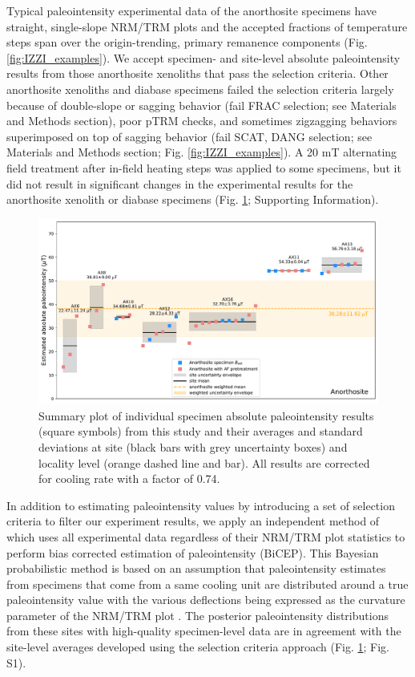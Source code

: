 \documentclass[9pt,twocolumn,twoside,lineno]{pnas-new}
\begin{document}
Typical paleointensity experimental data of the anorthosite specimens have straight, single-slope NRM/TRM plots and the accepted fractions of temperature steps span over the origin-trending, primary remanence components (Fig. \ref{fig:IZZI_examples}). We accept specimen- and site-level absolute paleointensity results from those anorthosite xenoliths that pass the selection criteria. Other anorthosite xenoliths and diabase specimens failed the selection criteria largely because of double-slope or sagging behavior (fail FRAC selection; see Materials and Methods section), poor pTRM checks, and sometimes zigzagging behaviors superimposed on top of sagging behavior (fail SCAT, DANG selection; see Materials and Methods section; Fig. \ref{fig:IZZI_examples}). A 20 mT alternating field treatment after in-field heating steps was applied to some specimens, but it did not result in significant changes in the experimental results for the anorthosite xenolith or diabase specimens (Fig. \ref{fig:PINT_cooling_corrected}; Supporting Information). 

\begin{figure}[h!]
\noindent\includegraphics[width=17.8 cm]{Paleointensity_plot_cooling_corrected.pdf}
\centering
\caption{\small{Summary plot of individual specimen absolute paleointensity results (square symbols) from this study and their averages and standard deviations at site (black bars with grey uncertainty boxes) and locality level (orange dashed line and bar). All results are corrected for cooling rate with a factor of 0.74. }}
\label{fig:PINT_cooling_corrected}
\end{figure}

In addition to estimating paleointensity values by introducing a set of selection criteria to filter our experiment results, we apply an independent method of \citealp{Cych2021a} which uses all experimental data regardless of their NRM/TRM plot statistics to perform bias corrected estimation of paleointensity (BiCEP). This Bayesian probabilistic method is based on an assumption that paleointensity estimates from specimens that come from a same cooling unit are distributed around a true paleointensity value with the various deflections being expressed as the curvature parameter of the NRM/TRM plot \cite{Paterson2011a}. The posterior paleointensity distributions from these sites with high-quality specimen-level data are in agreement with the site-level averages developed using the selection criteria approach (Fig. \ref{fig:PINT_cooling_corrected}; Fig. S1).
\end{document}
